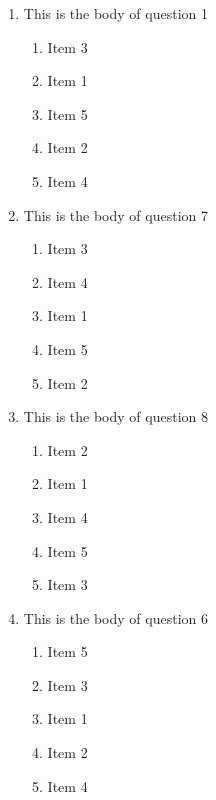 \documentclass[amsfonts,bezier,leqno,fleqn,12pt,a4paper]{article}
\begin{document}
{\begin{large}
\begin{enumerate}
\begin{enumerate}
\end{enumerate}

\vspace {3.5cm}


\item This is the body of question 1
\vspace {0.3in}
\setcounter{equation}{0}

\begin{enumerate}
\item  Item 3
\item  Item 1
\item  Item 5
\item  Item 2
\item  Item 4

\end{enumerate}
\newpage


\item This is the body of question 7
\vspace {0.3in}
\setcounter{equation}{0}

\begin{enumerate}
\item  Item 3
\item  Item 4
\item  Item 1
\item  Item 5
\item  Item 2

\end{enumerate}

\vspace {3.5cm}


\item This is the body of question 8
\vspace {0.3in}
\setcounter{equation}{0}

\begin{enumerate}
\item  Item 2
\item  Item 1
\item  Item 4
\item  Item 5
\item  Item 3

\end{enumerate}
\newpage


\item This is the body of question 6
\vspace {0.3in}
\setcounter{equation}{0}

\begin{enumerate}
\item  Item 5
\item  Item 3
\item  Item 1
\item  Item 2
\item  Item 4


\end{enumerate}
\end{enumerate}
\end{large}}
\end{document}
